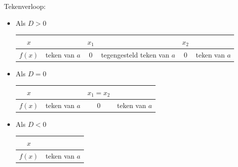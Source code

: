 
Tekenverloop:

\begin{itemize}
\item Als $D>0$ \\
\begin{tabular}{c||c|c|c|c|c}
$x$ &  & $x_{1}$ &  & $x_{2}$ & \\
\hline 
$f(x)$ & teken van $a$ & 0 & tegengesteld teken van $a$ & 0 & teken van $a$\\
\end{tabular}
\item Als $D=0$ \\
\begin{tabular}{c||c|c|c}
	$x$ &  & $x_{1}=x_{2}$ & \\
	\hline 
	$f(x)$ & teken van $a$ & 0 & teken van $a$\\
\end{tabular}
\item Als $D<0$ \\
\begin{tabular}{c||c}
$x$ & \\
\hline 
$f(x)$ & teken van $a$\\
\end{tabular}
\end{itemize}


